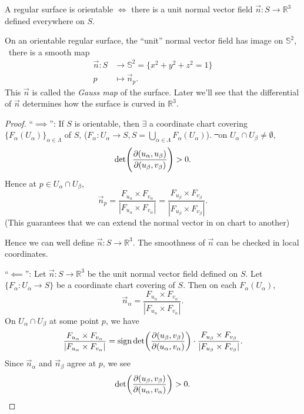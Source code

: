 \begin{prop}
    A regular surface is orientable \(\iff \) there is a unit normal vector field
    \(\vec{n}\colon S\to \mathbb{R}^3\) defined everywhere on \(S\).
\end{prop}

\begin{remark}
    On an orientable regular surface, the ``unit'' normal vector field has image
    on \(\mathbb{S}^2\), \ie\ there is a smooth map 
    \begin{align*}
        \vec{n}\colon S &\longrightarrow \mathbb{S}^2=\{x^2+y^2+z^2=1\} \\
        p &\longmapsto \vec{n}_p
    .\end{align*}
    This \(\vec{n}\) is called the \emph{Gauss map} of the surface. Later we'll
    see that the differential of \(\vec{n}\) determines how the surface is curved
    in \(\mathbb{R}^3\).
\end{remark}

\begin{proof}
    ``\(\implies \)'': If \(S\) is orientable, then \(\exists\) a coordinate chart
    covering \(\{F_\alpha(U_\alpha)\}_{\alpha\in \Lambda}\) of \(S\),
    (\(F_\alpha\colon U_\alpha\to S,S=\bigcup_{\alpha\in \Lambda}F_\alpha(U_\alpha)
    \)). \st\ on \(U_\alpha\cap U_\beta\neq \emptyset\), \[
        \det(\pdv{(u_\alpha,u_\beta)}{(u_\beta,v_\beta)})>0
    .\] Hence at \(p\in U_\alpha\cap U_\beta\), \[
        \vec{n}_p
        =\frac{F_{u_\alpha}\times F_{v_\alpha}}{|F_{u_\alpha}\times F_{v_\alpha}|}
        =\frac{F_{u_\beta}\times F_{v_\beta}}{|F_{u_\beta}\times F_{v_\beta}|}
    .\] (This guarantees that we can extend the normal vector in on chart to another)
    
    Hence we can well define \(\vec{n}\colon S\to \mathbb{R}^3\). The smoothness of
    \(\vec{n}\) can be checked in local coordinates.

    ``\(\impliedby \)'': Let \(\vec{n}\colon S\to \mathbb{R}^3\) be the unit normal
    vector field defined on \(S\). Let \(\{F_\alpha\colon U_\alpha\to S\}\) be a
    coordinate chart covering of \(S\). Then on each \(F_\alpha(U_\alpha)\), \[
        \vec{n}_\alpha
        =\frac{F_{u_\alpha}\times F_{v_\alpha}}{|F_{u_\alpha}\times F_{v_\alpha}|}
    .\] On \(U_\alpha\cap U_\beta\) at some point \(p\), we have \[
        \frac{F_{u_\alpha}\times F_{v_\alpha}}{|F_{u_\alpha}\times F_{v_\alpha}|}
        =\operatorname{sign} \det(\pdv{(u_\beta,v_\beta)}{(u_\alpha,v_\alpha)})\cdot 
        \frac{F_{u_\beta}\times F_{v_\beta}}{|F_{u_\beta}\times F_{v_\beta}|}
    .\] Since \(\vec{n}_\alpha\) and \(\vec{n}_\beta\) agree at \(p\), we see \[
        \det(\pdv{(u_\beta,v_\beta)}{(u_\alpha,v_\alpha)})>0
    .\] 
\end{proof}

